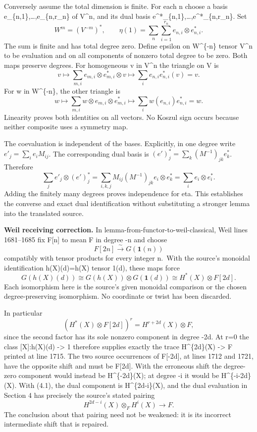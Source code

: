 \documentclass[11pt]{article}
\begin{document}
Conversely assume the total dimension is finite. For each n choose a basis e\_\{n,1\},\ldots,e\_\{n,r\_n\} of V\^{}n, and its dual basis e\^{}*\_\{n,1\},\ldots,e\^{}*\_\{n,r\_n\}. Set \[
W^m=(V^{-m})^*,\qquad
\eta(1)=\sum_n\sum_{i=1}^{r_n}e_{n,i}\otimes e^*_{n,i}.
\] The sum is finite and has total degree zero. Define epsilon on W\^{}\{-n\} tensor V\^{}n to be evaluation and on all components of nonzero total degree to be zero. Both maps preserve degrees. For homogeneous v in V\^{}n the triangle on V is \[
v\longmapsto
\sum_{m,i}e_{m,i}\otimes e^*_{m,i}\otimes v
\longmapsto
\sum_i e_{n,i}e^*_{n,i}(v)=v.
\] For w in W\^{}\{-n\}, the other triangle is \[
w\longmapsto
\sum_{m,i}w\otimes e_{m,i}\otimes e^*_{m,i}
\longmapsto
\sum_i w(e_{n,i})e^*_{n,i}=w.
\] Linearity proves both identities on all vectors. No Koszul sign occurs because neither composite uses a symmetry map.

The coevaluation is independent of the bases. Explicitly, in one degree write \(e'_j=\sum_i e_i M_{ij}\). The corresponding dual basis is \((e')^*_j=\sum_k (M^{-1})_{jk}e_k^*\). Therefore \[
\sum_j e'_j\otimes(e')^*_j
=\sum_{i,k,j}M_{ij}(M^{-1})_{jk}e_i\otimes e_k^*
=\sum_i e_i\otimes e_i^*.
\] Adding the finitely many degrees proves independence for eta. This establishes the converse and exact dual identification without substituting a stronger lemma into the translated source.

\textbf{Weil receiving correction.} In lemma-from-functor-to-weil-classical, Weil lines 1681--1685 fix F{[}n{]} to mean F in degree -n and choose \[
F[2n]\xrightarrow{\sim}G(\mathbf1(n))
\] compatibly with tensor products for every integer n.~With the source's monoidal identification h(X)(d)=h(X) tensor 1(d), these maps force \[
G(h(X)(d))
\cong G(h(X))\otimes G(\mathbf1(d))
\cong H^*(X)\otimes F[2d].                                \tag{4.1}
\] Each isomorphism here is the source's given monoidal comparison or the chosen degree-preserving isomorphism. No coordinate or twist has been discarded.

In particular \[
(H^*(X)\otimes F[2d])^r
 = H^{r+2d}(X)\otimes F,
\] since the second factor has its sole nonzero component in degree -2d. At r=0 the class {[}X{]}:h(X)(d) -\textgreater{} 1 therefore supplies exactly the trace H\^{}\{2d\}(X) -\textgreater{} F printed at line 1715. The two source occurrences of F{[}-2d{]}, at lines 1712 and 1721, have the opposite shift and must be F{[}2d{]}. With the erroneous shift the degree-zero component would instead be H\^{}\{-2d\}(X); at degree -i it would be H\^{}\{-i-2d\}(X). With (4.1), the dual component is H\^{}\{2d-i\}(X), and the dual evaluation in Section 4 has precisely the source's stated pairing \[
H^{2d-i}(X)\otimes_F H^i(X)\longrightarrow F.
\] The conclusion about that pairing need not be weakened: it is its incorrect intermediate shift that is repaired.
\end{document}
